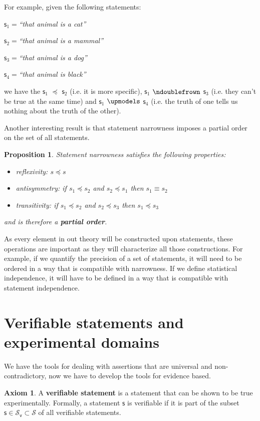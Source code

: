 \documentclass[letterpaper]{article}
\theoremstyle{plain}%
\newtheorem{prop}[thrm]{Proposition}
\theoremstyle{definition}
\newtheorem{axiom}[thrm]{Axiom}
\theoremstyle{remark}
\def\stmtSet{\mathcal{S}}
\def\vstmtSet{\mathcal{S}_\textsf{v}}
\def\ncomp{\ndoublefrown}
\def\narrower{\preccurlyeq}
\def\indep{\upmodels}
\newcommand{\stmt}[1][s] {\mathsf{#1}}
\newcommand{\statement}[1] {\emph{``#1''}}
\begin{document}
For example, given the following statements:
\begin{description}
	\item $\stmt_1=$\statement{that animal is a cat}
	\item $\stmt_2=$\statement{that animal is a mammal}
	\item $\stmt_3=$\statement{that animal is a dog}
	\item $\stmt_4=$\statement{that animal is black}
\end{description}
we have the $\stmt_1$ $\narrower$ $\stmt_2$ (i.e. it is more specific), $\stmt_1$ $\ncomp$ $\stmt_3$ (i.e. they can't be true at the same time) and $\stmt_1$ $\indep$ $\stmt_4$ (i.e. the truth of one tells us nothing about the truth of the other).

Another interesting result is that statement narrowness imposes a partial order on the set of all statements.

\begin{prop}
	Statement narrowness satisfies the following properties:
	\begin{itemize}
		\item reflexivity: $s \narrower s$
		\item antisymmetry: if $s_1 \narrower s_2$ and  $s_2 \narrower s_1$ then $s_1 \equiv s_2$
		\item transitivity: if $s_1 \narrower s_2$ and $s_2 \narrower s_3$ then $s_1 \narrower s_3$
	\end{itemize}
	and is therefore a \textbf{partial order}.
\end{prop}

As every element in out theory will be constructed upon statements, these operations are important as they will characterize all those constructions. For example, if we quantify the precision of a set of statements, it will need to be ordered in a way that is compatible with narrowness. If we define statistical independence, it will have to be defined in a way that is compatible with statement independence.

\section{Verifiable statements and experimental domains}

We have the tools for dealing with assertions that are universal and non-contradictory, now we have to develop the tools for evidence based.

\begin{axiom}\label{ax_verifiable_statements}
	A \textbf{verifiable statement} is a statement that can be shown to be true experimentally. Formally, a statement $\stmt$ is verifiable if it is part of the subset $\stmt \in \vstmtSet \subset \stmtSet$ of all verifiable statements.
\end{axiom}
\end{document}
